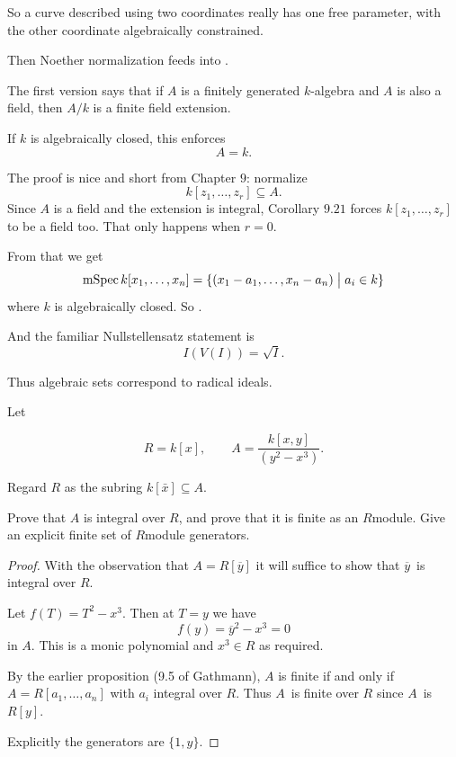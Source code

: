 \documentclass[11pt]{article}
\begin{document}
So a curve described using two coordinates really 
has one free parameter, with the other 
coordinate algebraically constrained. 

Then Noether normalization feeds into 
. 

The first version says that 
if $A$ is a finitely generated $k$-algebra and 
$A$ is also a field, then $A/k$ is a finite field extension. 

If $k$ is algebraically closed, this enforces 
\[
    A = k. 
\]

The proof is nice and short from Chapter $9$: 
normalize 
\[
    k[z_1,\ldots,z_r] \subseteq A. 
\]
Since $A$ is a field and the extension is integral, 
Corollary $9.21$ forces $k[z_1,\ldots,z_r]$ to be a 
field too. That only happens when $r = 0$. 

From that we get 
\[
    \operatorname{mSpec} k[x_1,\ldots,x_n] 
    = \{(x_1 - a_1,\ldots,x_n - a_n) \bigm| a_i \in k\} 
\]
where $k$ is algebraically closed. So 
. 

And the familiar Nullstellensatz statement is 
\[
    I(V(I)) = \sqrt I. 
\]

Thus algebraic sets correspond to radical ideals. 

\begin{prob}
    Let

    $$R=k[x], \qquad A=\frac{k[x,y]}{(y^2-x^3)}.$$

    Regard $R$ as the subring $k[\bar x]\subseteq A$.

    Prove that $A$ is integral over $R$, and prove that it is finite as an $R$\-module. Give an explicit finite set of $R$\-module generators.
\end{prob}
\begin{proof}
    With the observation that 
    $A = R[\overline y]$ it will suffice to 
    show that $\overline y$ is integral over $R$. 

    Let $f(T) = T^2 - x^3$. 
    Then at $T = y$ we have 
    \[
        f(y) = \overline y^2 - x^3 = 0
    \]
    in $A$. This is a monic polynomial and  
    $x^3 \in R$ as required. 

    By the earlier proposition (9.5 of Gathmann), 
    $A$ is finite if and only if $A = R[a_1,\ldots,a_n]$ 
    with $a_i$ integral over $R$. Thus $A$ is finite over 
    $R$ since $A$ is $R[y]$. 

    Explicitly the generators are 
    $\{1,y\}$. 
\end{proof}
\end{document}
